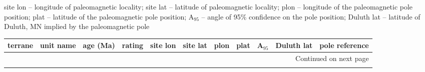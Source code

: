 \begin{ThreePartTable}
\begin{TableNotes}
\footnotesize
site lon -- longitude of paleomagnetic locality;
site lat -- latitude of paleomagnetic locality;
plon -- longitude of the paleomagnetic pole position;
plat -- latitude of the paleomagnetic pole position;
A$_{95}$ -- angle of 95$\%$ confidence on the pole position;
Duluth lat -- latitude of Duluth, MN implied by the paleomagnetic pole
\end{TableNotes}

\begin{longtable}{p{1.4 in}p{1.2 in}rrrrrrrrp{1.2 in}}
\toprule
terrane & unit name & age (Ma) & rating & site lon & site lat & plon & plat & A$_{95}$ & Duluth lat & pole reference \\ \hline
\midrule
\endhead
\midrule
\multicolumn{11}{r}{{Continued on next page}} \\ \hline
\midrule
\endfoot


\end{longtable}
\end{ThreePartTable}
